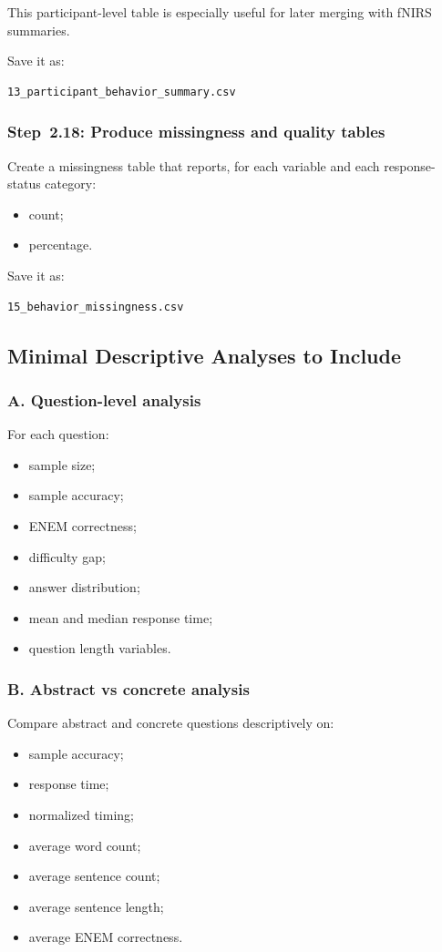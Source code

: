 \documentclass[11pt]{article}
\begin{document}
This participant-level table is especially useful for later merging with fNIRS summaries.

Save it as:
\begin{verbatim}
13_participant_behavior_summary.csv
\end{verbatim}

\subsubsection{Step~2.18: Produce missingness and quality tables}
Create a missingness table that reports, for each variable and each response-status category:
\begin{itemize}
    \item count;
    \item percentage.
\end{itemize}

Save it as:
\begin{verbatim}
15_behavior_missingness.csv
\end{verbatim}

\subsection{Minimal Descriptive Analyses to Include}

\subsubsection*{A. Question-level analysis}
For each question:
\begin{itemize}
    \item sample size;
    \item sample accuracy;
    \item ENEM correctness;
    \item difficulty gap;
    \item answer distribution;
    \item mean and median response time;
    \item question length variables.
\end{itemize}

\subsubsection*{B. Abstract vs concrete analysis}
Compare abstract and concrete questions descriptively on:
\begin{itemize}
    \item sample accuracy;
    \item response time;
    \item normalized timing;
    \item average word count;
    \item average sentence count;
    \item average sentence length;
    \item average ENEM correctness.
\end{itemize}
\end{document}

